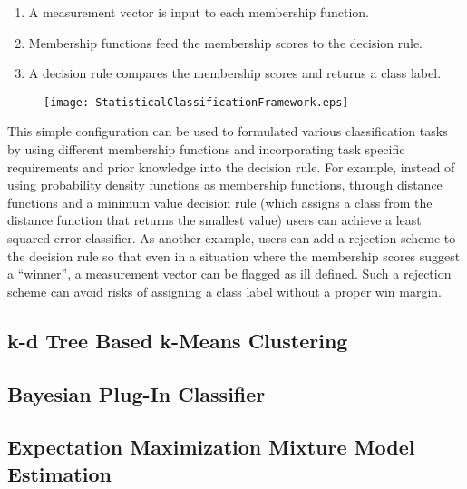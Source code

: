 \begin{enumerate}
\item{A measurement vector is input to each membership function.}
\item{Membership functions feed the membership scores to the
    decision rule.}
\item{A decision rule compares the membership scores and returns a
    class label.}
\end{enumerate}

\begin{figure}
  \centering
  \texttt{[image: StatisticalClassificationFramework.eps]}
  \protect\label{fig:StatisticalClassificationFramework}
\end{figure}

This simple configuration can be used to formulated various classification
tasks by using different membership functions and incorporating task specific
requirements and prior knowledge into the decision rule. For example, instead
of using probability density functions as membership functions, through
distance functions and a minimum value decision rule (which assigns a class
from the distance function that returns the smallest value) users can achieve a
least squared error classifier. As another example, users can add a rejection
scheme to the decision rule so that even in a situation where the membership
scores suggest a ``winner'', a measurement vector can be flagged as ill
defined. Such a rejection scheme can avoid risks of assigning a class label
without a proper win margin.

\subsection{k-d Tree Based k-Means Clustering}
\label{sec:KdTreeBasedKMeansClustering}



\subsection{Bayesian Plug-In Classifier}
\label{sec:BayesianPluginClassifier}



\subsection{Expectation Maximization Mixture Model Estimation}
\label{sec:ExpectationMaximizationMixtureModelEstimation}





